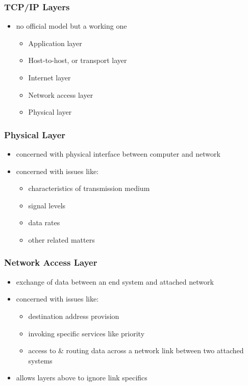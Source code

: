 \documentclass[pdflatex,compress]{beamer}
\begin{document}
\begin{frame}
	\frametitle{TCP/IP Layers}
	\begin{itemize}
		\item no official model but a working one
		\begin{itemize}
			\item Application layer
			\item Host-to-host, or transport layer
			\item Internet layer
			\item Network access layer
			\item Physical layer
		\end{itemize}
	\end{itemize}
\end{frame}

\begin{frame}
	\frametitle{Physical Layer}
	\begin{itemize}
		\item concerned with physical interface between computer and network
		\item concerned with issues like:
		\begin{itemize}
			\item characteristics of transmission medium
			\item signal levels
			\item data rates
			\item other related matters
		\end{itemize}
	\end{itemize}
\end{frame}

\begin{frame}
	\frametitle{Network Access Layer}
	\begin{itemize}
		\item exchange of data between an end system and attached network
		\item concerned with issues like:
		\begin{itemize}
			\item destination address provision
			\item invoking specific services like priority
			\item access to \& routing data across a network link between two attached systems
		\end{itemize}
		\item allows layers above to ignore link specifics
	\end{itemize}
\end{frame}
\end{document}
